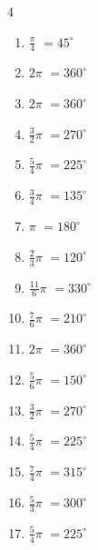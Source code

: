 \begin{multicols}{4}
\begin{enumerate}
  \item $\displaystyle \frac{\pi}{4}$
        $\displaystyle =45^{\circ}$

  \item $\displaystyle 2\pi$
        $\displaystyle =360^{\circ}$

  \item $\displaystyle 2\pi$
        $\displaystyle =360^{\circ}$

  \item $\displaystyle \frac{3}{2}\pi$
        $\displaystyle =270^{\circ}$

  \item $\displaystyle \frac{5}{4}\pi$
        $\displaystyle =225^{\circ}$

  \item $\displaystyle \frac{3}{4}\pi$
        $\displaystyle =135^{\circ}$

  \item $\displaystyle \pi$
        $\displaystyle =180^{\circ}$

  \item $\displaystyle \frac{2}{3}\pi$
        $\displaystyle =120^{\circ}$

  \item $\displaystyle \frac{11}{6}\pi$
        $\displaystyle =330^{\circ}$

  \item $\displaystyle \frac{7}{6}\pi$
        $\displaystyle =210^{\circ}$

  \item $\displaystyle 2\pi$
        $\displaystyle =360^{\circ}$

  \item $\displaystyle \frac{5}{6}\pi$
        $\displaystyle =150^{\circ}$

  \item $\displaystyle \frac{3}{2}\pi$
        $\displaystyle =270^{\circ}$

  \item $\displaystyle \frac{5}{4}\pi$
        $\displaystyle =225^{\circ}$

  \item $\displaystyle \frac{7}{4}\pi$
        $\displaystyle =315^{\circ}$

  \item $\displaystyle \frac{5}{3}\pi$
        $\displaystyle =300^{\circ}$

  \item $\displaystyle \frac{5}{4}\pi$
        $\displaystyle =225^{\circ}$


\end{enumerate}
\end{multicols}
